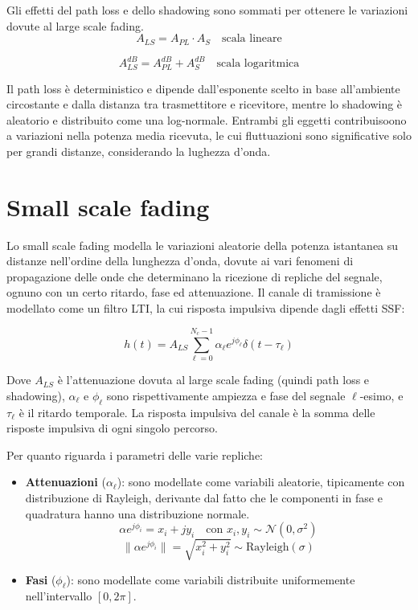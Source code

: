Gli effetti del path loss e dello shadowing sono sommati per ottenere le variazioni dovute al large scale fading. 
\[
    A_{LS} = A_{PL} \cdot A_S \quad \text{scala lineare}
\]

\[
    A_{LS}^{dB} = A_{PL}^{dB} + A_S^{dB} \quad \text{scala logaritmica}
\]


Il path loss è deterministico e dipende dall'esponente scelto in base all'ambiente circostante e dalla distanza tra trasmettitore e ricevitore, mentre lo shadowing è aleatorio e distribuito come una log-normale. Entrambi gli eggetti contribuisoono a variazioni nella potenza media ricevuta, le cui fluttuazioni sono significative solo per grandi distanze, considerando la lughezza d'onda.



\section*{Small scale fading}

Lo small scale fading modella le variazioni aleatorie della potenza istantanea su distanze nell'ordine della lunghezza d'onda, dovute ai vari fenomeni di propagazione delle onde che determinano la ricezione di repliche del segnale, ognuno con un certo ritardo, fase ed attenuazione. 
Il canale di tramissione è modellato come un filtro LTI, la cui risposta impulsiva dipende dagli effetti SSF:

\[
    h(t) = A_{LS} \sum_{\ell=0}^{N_c-1} \alpha_{\ell} e^{j\phi_{\ell}} \delta(t - \tau_{\ell})
\]

Dove \( A_{LS} \) è l'attenuazione dovuta al large scale fading (quindi path loss e shadowing), \( \alpha_{\ell} \) e \( \phi_{\ell} \) sono rispettivamente ampiezza e fase del segnale \(\ell\)-esimo, e \( \tau_{\ell} \) è il ritardo temporale. La risposta impulsiva del canale è la somma delle risposte impulsiva di ogni singolo percorso.

Per quanto riguarda i parametri delle varie repliche:
\begin{itemize}
    \item \textbf{Attenuazioni} ($\alpha_\ell$): sono modellate come variabili aleatorie, tipicamente con distribuzione di Rayleigh, derivante dal fatto che le componenti in fase e quadratura hanno una distribuzione normale.
    \[
        \alpha e^{j\phi_i} = x_i + j y_i \quad \text{con } x_i, y_i \sim \mathcal{N}(0, \sigma^2)
    \]
    \[
        \|\alpha e^{j\phi_i}\| = \sqrt{x_i^2 + y_i^2} \sim \text{Rayleigh}(\sigma)
    \]
    \item \textbf{Fasi} ($\phi_\ell$): sono modellate come variabili distribuite uniformemente nell'intervallo $[0, 2\pi]$.
\end{itemize}

